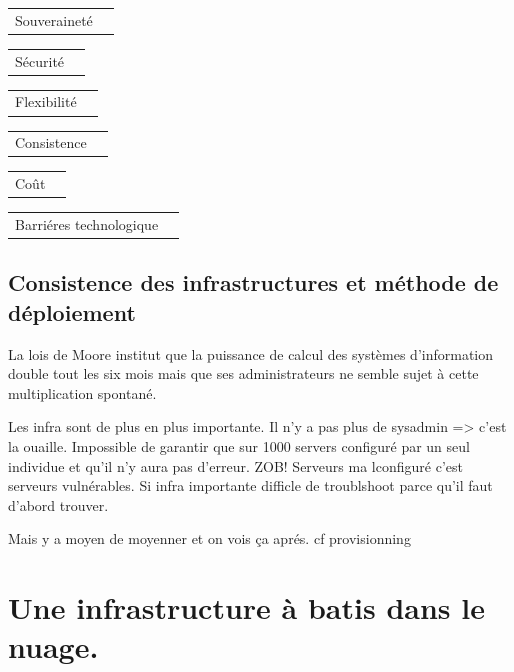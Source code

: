 \documentclass[11pt, a4paper ]{article}
\let\stdsection\section
\renewcommand\section{\newpage\stdsection}
\begin{document}
\begin{spacing}{1.5}
\begin{center}
	\begin{tabular}{| l | c | }
		Souveraineté & \\
	\end{tabular}
	\begin{tabular}{| l | c | }
		Sécurité & \\
	\end{tabular}
	\begin{tabular}{| l | c | }
		Flexibilité & \\
	\end{tabular}
	\begin{tabular}{| l | c | }
		Consistence & \\
	\end{tabular}
	\begin{tabular}{| l | c | }
		Coût & \\
	\end{tabular}
	\begin{tabular}{| l | c | }
		Barriéres technologique & \\
	\end{tabular}
\end{center}


			\subsection{Consistence des infrastructures et méthode de déploiement}

La lois de Moore institut que la puissance de calcul des systèmes d'information double tout les six mois mais que ses administrateurs ne semble sujet à cette multiplication spontané. 

Les infra sont de plus en plus importante. Il n'y a pas plus de sysadmin => c'est la ouaille.
Impossible de garantir que sur 1000 servers configuré par un seul individue et qu'il n'y aura pas d'erreur. ZOB!
Serveurs ma lconfiguré c'est serveurs vulnérables. Si infra importante difficle de troublshoot parce qu'il faut d'abord trouver.

Mais y a moyen de moyenner et on vois ça aprés. cf provisionning

\section{Une infrastructure à batis dans le nuage.}	 %


\end{spacing}
\end{document}
